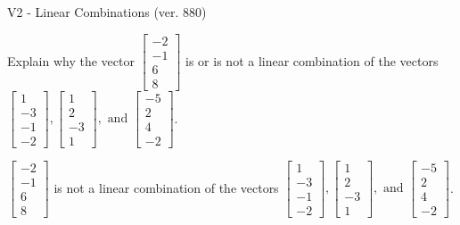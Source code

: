 \begin{exercise}
  \begin{exerciseTitle}V2 - Linear Combinations (ver. 880)\end{exerciseTitle}
  \begin{exerciseStatement}
    Explain why the vector \(\left[\begin{array}{c}
-2 \\
-1 \\
6 \\
8
\end{array}\right]\)  is or is not a linear 
	combination of the vectors \(\left[\begin{array}{c}
1 \\
-3 \\
-1 \\
-2
\end{array}\right] , \left[\begin{array}{c}
1 \\
2 \\
-3 \\
1
\end{array}\right] , \text{ and } \left[\begin{array}{c}
-5 \\
2 \\
4 \\
-2
\end{array}\right]\).
	


  \end{exerciseStatement}
  \begin{exerciseAnswer}
   \(\left[\begin{array}{c}
-2 \\
-1 \\
6 \\
8
\end{array}\right]\) 
  	 is not  
	a linear combination of the vectors \(\left[\begin{array}{c}
1 \\
-3 \\
-1 \\
-2
\end{array}\right] , \left[\begin{array}{c}
1 \\
2 \\
-3 \\
1
\end{array}\right] , \text{ and } \left[\begin{array}{c}
-5 \\
2 \\
4 \\
-2
\end{array}\right]\).

	
  


  \end{exerciseAnswer}
\end{exercise}